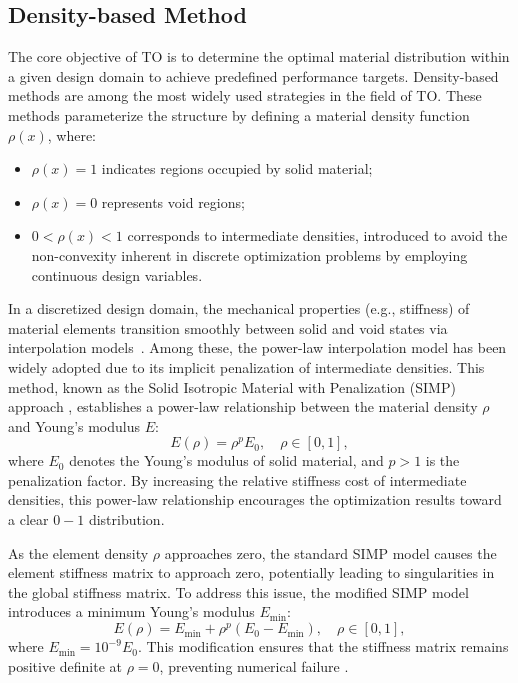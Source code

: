 \documentclass[mathpazo]{cicp}
\begin{document}
\subsection{Density-based Method}
The core objective of TO is to determine the optimal material distribution within a given design domain to achieve predefined performance targets. Density-based methods are among the most widely used strategies in the field of TO. These methods parameterize the structure by defining a material density function $\rho(x)$, where:
\begin{itemize}
	\item $\rho(x) = 1$ indicates regions occupied by solid material;
	\item $\rho(x) = 0$ represents void regions;
	\item $0 < \rho(x) < 1$ corresponds to intermediate densities, introduced to avoid the non-convexity inherent in discrete optimization problems by employing continuous design variables.
\end{itemize}

In a discretized design domain, the mechanical properties (e.g., stiffness) of material elements transition smoothly between solid and void states via interpolation models~\cite{bendsoe1989optimal}. Among these, the power-law interpolation model has been widely adopted due to its implicit penalization of intermediate densities. This method, known as the Solid Isotropic Material with Penalization (SIMP) approach \cite{zhou1991coc}, establishes a power-law relationship between the material density $\rho$ and Young's modulus $E$:
\begin{equation*}
	E(\rho) = \rho^p E_0,\quad \rho \in [0,1],
\end{equation*}
where $E_0$ denotes the Young's modulus of solid material, and $p>1$ is the penalization factor. By increasing the relative stiffness cost of intermediate densities, this power-law relationship encourages the optimization results toward a clear $0-1$ distribution.

As the element density $\rho$ approaches zero, the standard SIMP model causes the element stiffness matrix to approach zero, potentially leading to singularities in the global stiffness matrix. To address this issue, the modified SIMP model introduces a minimum Young's modulus $E_{\min}$:
\begin{equation*}
	E(\rho) = E_{\min} + \rho^p(E_0 - E_{\min}),\quad \rho \in [0,1],
\end{equation*}
where $E_{\min} = 10^{-9} E_0$. This modification ensures that the stiffness matrix remains positive definite at $\rho = 0$, preventing numerical failure \cite{sigmund2007morphology}.
\end{document}
